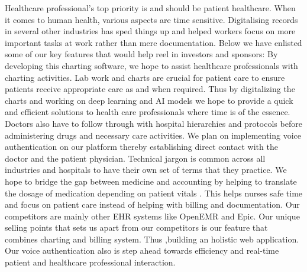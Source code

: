 Healthcare professional's top priority is and should be patient healthcare. When it comes to human health, various aspects are time sensitive. Digitalising records in several other industries has sped things up and helped workers focus on more important tasks at work rather than mere documentation. Below we have enlisted some of our key features that would help reel in investors and sponsors:
By developing this charting software, we hope to assist healthcare professionals with charting activities. 
Lab work and charts are crucial for patient care to ensure patients receive appropriate care as and when required. Thus by digitalizing the charts and working on deep learning and AI models we hope to provide a quick and efficient solutions to health care professionals where time is of the essence. 
Doctors also have to follow through with hospital hierarchies and protocols before administering drugs and necessary care activities. We plan on implementing voice authentication on our platform thereby establishing direct contact with the doctor and the patient physician.
Technical jargon is common across all industries and hospitals to have their own set of terms that they practice. We hope to bridge the gap between medicine and accounting by helping to translate the dosage of medication depending on patient vitals . This helps nurses safe time and focus on patient care instead of helping with billing and documentation. 
Our competitors are mainly other EHR systems like OpenEMR and Epic. Our unique selling points that sets us apart from our competitors is our feature that combines charting and billing system. Thus ,building an holistic web application. Our voice authentication also is step ahead towards efficiency and real-time patient and healthcare professional interaction. 
